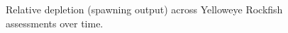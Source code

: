 \documentclass[
]{scrartcl}
\begin{document}
\begin{figure}


\caption{\label{fig-status_assmtns}Relative depletion (spawning output)
across Yelloweye Rockfish assessments over time.}

\end{figure}%
\end{document}
